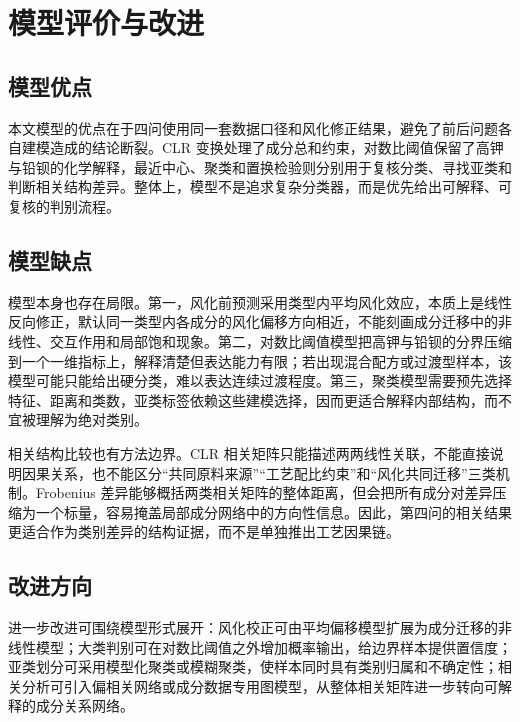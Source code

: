 \documentclass[UTF8,zihao=-4,a4paper,fontset=fandol]{ctexart}
\begin{document}
\section{模型评价与改进}

\subsection{模型优点}

本文模型的优点在于四问使用同一套数据口径和风化修正结果，避免了前后问题各自建模造成的结论断裂。CLR 变换处理了成分总和约束，对数比阈值保留了高钾与铅钡的化学解释，最近中心、聚类和置换检验则分别用于复核分类、寻找亚类和判断相关结构差异。整体上，模型不是追求复杂分类器，而是优先给出可解释、可复核的判别流程。

\subsection{模型缺点}

模型本身也存在局限。第一，风化前预测采用类型内平均风化效应，本质上是线性反向修正，默认同一类型内各成分的风化偏移方向相近，不能刻画成分迁移中的非线性、交互作用和局部饱和现象。第二，对数比阈值模型把高钾与铅钡的分界压缩到一个一维指标上，解释清楚但表达能力有限；若出现混合配方或过渡型样本，该模型可能只能给出硬分类，难以表达连续过渡程度。第三，聚类模型需要预先选择特征、距离和类数，亚类标签依赖这些建模选择，因而更适合解释内部结构，而不宜被理解为绝对类别。

相关结构比较也有方法边界。CLR 相关矩阵只能描述两两线性关联，不能直接说明因果关系，也不能区分“共同原料来源”“工艺配比约束”和“风化共同迁移”三类机制。Frobenius 差异能够概括两类相关矩阵的整体距离，但会把所有成分对差异压缩为一个标量，容易掩盖局部成分网络中的方向性信息。因此，第四问的相关结果更适合作为类别差异的结构证据，而不是单独推出工艺因果链。

\subsection{改进方向}

进一步改进可围绕模型形式展开：风化校正可由平均偏移模型扩展为成分迁移的非线性模型；大类判别可在对数比阈值之外增加概率输出，给边界样本提供置信度；亚类划分可采用模型化聚类或模糊聚类，使样本同时具有类别归属和不确定性；相关分析可引入偏相关网络或成分数据专用图模型，从整体相关矩阵进一步转向可解释的成分关系网络。
\end{document}
